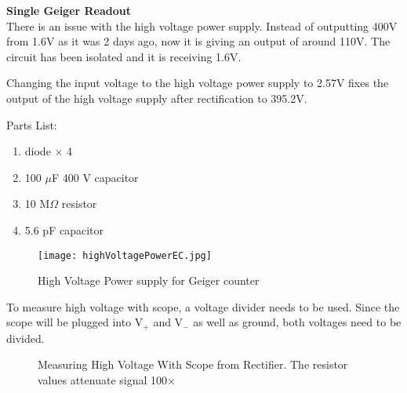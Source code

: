 \documentclass[oneside]{tufte-book}
\newenvironment{loggentry}[2]%
{\noindent\huge{\textbf{#2}}\normalsize\vspace{0.5cm}\marginnote{#1}\\}{\vspace{0.5cm}}
\begin{document}
  \begin{loggentry}{2018-Aug-30}{Single Geiger Readout}
    There is an issue with the high voltage power supply. Instead of outputting 400V from 1.6V as it was 2 days ago, now it is giving an output of around 110V. The circuit has been isolated and it is receiving 1.6V.

    Changing the input voltage to the high voltage power supply to 2.57V fixes the output of the high voltage supply after rectification to 395.2V.

    Parts List:
    \begin{enumerate}
      \item diode $\times$ 4
      \item 100 $\mu$F 400 V capacitor
      \item 10 M$\Omega$ resistor
      \item 5.6 pF capacitor
    \end{enumerate}

    \begin{figure}
        \texttt{[image: highVoltagePowerEC.jpg]}
        \caption{High Voltage Power supply for Geiger counter}
        \label{powerSupplyReal}
    \end{figure}

    To measure high voltage with scope, a voltage divider needs to be used. Since the scope will be plugged into V$_+$ and V$_-$ as well as ground, both voltages need to be divided.

    \begin{figure}
        \centering
        
        \caption{Measuring High Voltage With Scope from Rectifier. The resistor values attenuate signal 100$\times$}
        \label{bridgeRectifierProblem}
    \end{figure}

  \end{loggentry}
\end{document}
